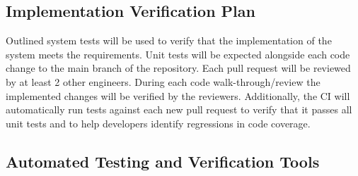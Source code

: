 \documentclass[12pt, titlepage]{article}
\begin{document}
\subsection{Implementation Verification Plan}

Outlined system tests will be used to verify that the implementation of the system meets the requirements. Unit tests will be expected alongside each code change to the main branch of the repository. Each pull request will be reviewed by at least 2 other engineers. During each code walk-through/review the implemented changes will be verified by the reviewers. Additionally, the CI will automatically run tests against each new pull request to verify that it passes all unit tests and to help developers identify regressions in code coverage.



\subsection{Automated Testing and Verification Tools}

\end{document}
